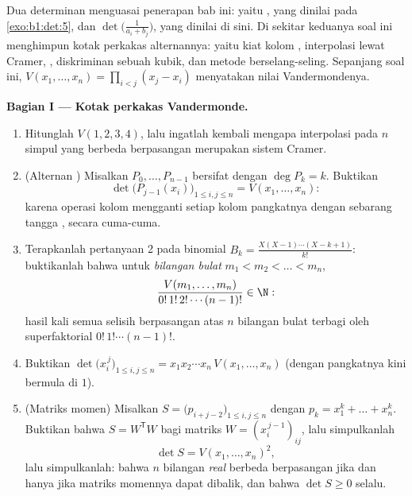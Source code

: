 \begin{problem}\label{pb:b1:det:1}
Dua determinan menguasai penerapan bab ini: yaitu
, yang dinilai pada \cref{exo:b1:det:5}, dan
\emph{} $\det\bigl(\frac{1}{a_i +
b_j}\bigr)$, yang dinilai di sini. Di sekitar keduanya soal ini menghimpun
kotak perkakas alternannya: yaitu kiat kolom , interpolasi
lewat Cramer, , diskriminan sebuah kubik, dan
metode  berselang-seling. Sepanjang soal ini, $V(x_1,
\dots, x_n) = \prod_{i < j}(x_j - x_i)$ menyatakan nilai
Vandermondenya.

\medskip
\noindent\textbf{Bagian I --- Kotak perkakas Vandermonde.}
\begin{enumerate}
  \item Hitunglah $V(1, 2, 3, 4)$, lalu ingatlah kembali mengapa interpolasi pada
        $n$ simpul yang berbeda berpasangan merupakan sistem Cramer.
  \item (Alternan ) Misalkan $P_0, \dots, P_{n-1}$
        bersifat \emph{} dengan $\deg P_k = k$. Buktikan
        \[
        \det\bigl(P_{j-1}(x_i)\bigr)_{1 \leq i, j \leq n}
        = V(x_1, \dots, x_n) :
        \]
        karena operasi kolom mengganti setiap kolom pangkatnya dengan sebarang tangga
        , secara cuma-cuma.
  \item Terapkanlah pertanyaan 2 pada  binomial $B_k =
        \frac{X(X-1)\cdots(X-k+1)}{k!}$: buktikanlah bahwa untuk
        \emph{bilangan bulat} $m_1 < m_2 < \dots < m_n$,
        \[
        \frac{V(m_1, \dots, m_n)}{0!\,1!\,2!\cdots(n-1)!}
        \in \N :
        \]
        hasil kali semua selisih berpasangan atas $n$ bilangan bulat
        terbagi oleh superfaktorial $0!\,1!\cdots(n-1)!$.
  \item Buktikan $\det\bigl(x_i^{\,j}\bigr)_{1 \leq i, j \leq n} =
        x_1 x_2 \cdots x_n\, V(x_1, \dots, x_n)$ (dengan pangkatnya kini
        bermula di $1$).
  \item (Matriks momen) Misalkan $S = \bigl(p_{i+j-2}\bigr)_{1 \leq
        i, j \leq n}$ dengan $p_k = x_1^k + \dots + x_n^k$. Buktikan
        bahwa $S = W^{\mathsf T} W$ bagi matriks $W =
        (x_i^{\,j-1})_{ij}$, lalu simpulkanlah
        \[
        \det S = V(x_1, \dots, x_n)^2 ,
        \]
        lalu simpulkanlah: bahwa $n$ bilangan \emph{real} berbeda
        berpasangan jika dan hanya jika matriks momennya
        dapat dibalik, dan bahwa $\det S \geq 0$ selalu.
\end{enumerate}


\end{problem}
